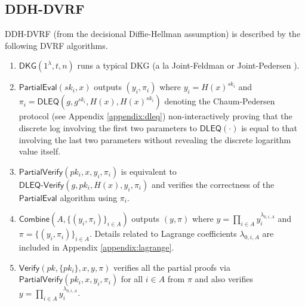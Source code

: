 \documentclass[letterpaper,twocolumn,10pt]{article}
\theoremstyle{definition}
\theoremstyle{remark}
\begin{document}
\subsection{DDH-DVRF}
\label{appendix:ddh-dvrf}
DDH-DVRF (from the decisional Diffie-Hellman assumption) is described by the following DVRF algorithms.
\begin{enumerate}
\item $\mathsf{DKG}(1^\lambda, t, n)$ runs a typical DKG (a la Joint-Feldman \cite{pedersen1991threshold} or Joint-Pedersen \cite{gennaro1999secure}).
\item $\mathsf{PartialEval}(sk_i, x)$ outputs $(y_i, \pi_i)$ where $y_i = H(x)^{sk_i}$ and $\pi_i = \mathsf{DLEQ}(g, g^{sk_i}, H(x), H(x)^{sk_i})$ denoting the Chaum-Pedersen protocol (see Appendix \ref{appendix:dleq}) non-interactively proving that the discrete log involving the first two parameters to $\mathsf{DLEQ}(\cdot)$ is equal to that involving the last two parameters without revealing the discrete logarithm value itself.
\item $\mathsf{PartialVerify}(pk_i, x, y_i, \pi_i)$ is equivalent to $\mathsf{DLEQ}\text{-}\mathsf{Verify}(g, pk_i, H(x), y_i, \pi_i)$ and verifies the correctness of the $\mathsf{PartialEval}$ algorithm using $\pi_i$.
\item $\mathsf{Combine}(A, \{(y_i, \pi_i)\}_{i \in A})$ outputs $(y, \pi)$ where $y = \prod_{i \in A} y_i^{\lambda_{0, i, A}}$ and $\pi = \{(y_i, \pi_i)\}_{i \in A}$. Details related to Lagrange coefficients $\lambda_{0, i, A}$ are included in Appendix \ref{appendix:lagrange}.
\item $\mathsf{Verify}(pk, \{pk_i\}, x, y, \pi)$ verifies all the partial proofs via $\mathsf{PartialVerify}(pk_i, x, y_i, \pi_i)$ for all $i \in A$ from $\pi$ and also verifies $y = \prod_{i \in A} y_i^{\lambda_{0, i, A}}$.
\end{enumerate}
\end{document}
